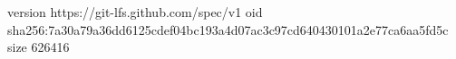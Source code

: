 version https://git-lfs.github.com/spec/v1
oid sha256:7a30a79a36dd6125cdef04bc193a4d07ac3c97cd640430101a2e77ca6aa5fd5c
size 626416
